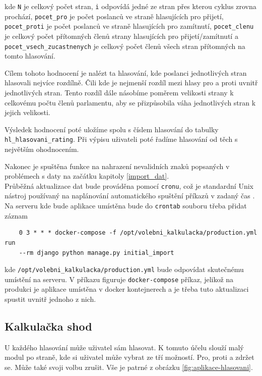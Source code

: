 kde \texttt{N} je celkový počet stran, \texttt{i} odpovídá jedné ze stran přes kterou cyklus zrovna prochází, \texttt{pocet\_pro} je počet poslanců ve straně hlasujících pro přijetí, \texttt{pocet\_proti} je počet poslanců ve straně hlasujících pro zamítnutí, \texttt{pocet\_clenu} je celkový počet přítomných členů strany hlasujících pro přijetí/zamítnutí a \texttt{pocet\_vsech\_zucastnenych} je celkový počet členů všech stran přítomných na tomto hlasování.

\par Cílem tohoto hodnocení je nalézt ta hlasování, kde poslanci jednotlivých stran hlasovali nejvíce rozdílně. Čili kde je nejmenší rozdíl mezi hlasy pro a proti uvnitř jednotlivých stran. Tento rozdíl dále násobíme poměrem velikosti strany k celkovému počtu členů parlamentu, aby se přizpůsobila váha jednotlivých stran k jejich velikosti.  

\par Výsledek hodnocení poté uložíme spolu s číslem hlasování do tabulky \texttt{hl\_hlasovani\_rating}. Při výpisu uživateli poté řadíme hlasování od těch s největším ohodnocením.\\

\par Nakonec je spuštěna funkce na nahrazení nevalidních znaků popsaných v problémech s daty na začátku kapitoly \ref{import_dat}.\\

Průběžná aktualizace dat bude prováděna pomocí \texttt{cronu}, což je standardní Unix nástroj používaný na naplánování automatického spuštění příkazů v zadaný čas \cite{cron}. Na serveru kde bude aplikace umístěna bude do \texttt{crontab} souboru třeba přidat záznam
\begin{verbatim}
    0 3 * * * docker-compose -f /opt/volebni_kalkulacka/production.yml run 
    --rm django python manage.py initial_import
\end{verbatim}
kde \texttt{/opt/volebni\_kalkulacka/production.yml} bude odpovídat skutečnému umístění na serveru. V příkazu figuruje \texttt{docker-compose} příkaz, jelikož na produkci je aplikace umístěna v docker kontejnerech a je třeba tuto aktualizaci spustit uvnitř jednoho z nich. 

\subsection{Kalkulačka shod}
U každého hlasování může uživatel sám hlasovat. K tomuto účelu slouží malý modul po straně, kde si uživatel může vybrat ze tří možností. Pro, proti a zdržet se. Může také svoji volbu zrušit. Vše je patrné z obrázku \ref{fig:aplikace-hlasovani}.

